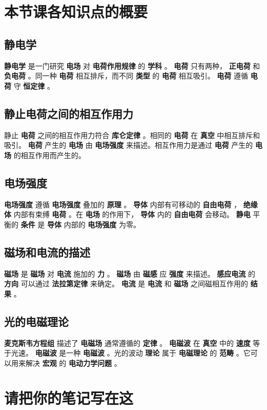 \documentclass{article}%
\begin{document}
%
\section{本节课各知识点的概要}%
\label{sec:}%
\textit{%
}

%
\begin{minipage}{0.95\textwidth}%
\subsection{静电学}%
\label{subsec:}%
%
\textbf{静电学}%
是一门研究%
\textbf{电场}%
对%
\textbf{电荷作用规律}%
的%
\textbf{学科}%
。%
\textbf{电荷}%
只有两种，%
\textbf{正电荷}%
和%
\textbf{负电荷}%
。同一种%
\textbf{电荷}%
相互排斥，而不同%
\textbf{类型}%
的%
\textbf{电荷}%
相互吸引。%
\textbf{电荷}%
遵循%
\textbf{电荷}%
守%
\textbf{恒定律}%
。

%
\subsection{静止电荷之间的相互作用力}%
\label{subsec:}%
静止%
\textbf{电荷}%
之间的相互作用力符合%
\textbf{库仑定律}%
。相同的%
\textbf{电荷}%
在%
\textbf{真空}%
中相互排斥和吸引。%
\textbf{电荷}%
产生的%
\textbf{电场}%
由%
\textbf{电场强度}%
来描述。相互作用力是通过%
\textbf{电荷}%
产生的%
\textbf{电场}%
的相互作用而产生的。

%
\subsection{电场强度}%
\label{subsec:}%
%
\textbf{电场强度}%
遵循%
\textbf{电场强度}%
叠加的%
\textbf{原理}%
。%
\textbf{导体}%
内部有可移动的%
\textbf{自由电荷}%
，%
\textbf{绝缘体}%
内部有束缚%
\textbf{电荷}%
。在%
\textbf{电场}%
的作用下，%
\textbf{导体}%
内的%
\textbf{自由电荷}%
会移动。%
\textbf{静电}%
平衡的%
\textbf{条件}%
是%
\textbf{导体}%
内部的%
\textbf{电场强度}%
为零。

%
\subsection{磁场和电流的描述}%
\label{subsec:}%
%
\textbf{磁场}%
是%
\textbf{磁场}%
对%
\textbf{电流}%
施加的%
\textbf{力}%
。%
\textbf{磁场}%
由%
\textbf{磁感}%
应%
\textbf{强度}%
来描述。%
\textbf{感应电流}%
的%
\textbf{方向}%
可以通过%
\textbf{法拉第定律}%
来确定。%
\textbf{电流}%
是%
\textbf{电流}%
和%
\textbf{磁场}%
之间磁相互作用的%
\textbf{结果}%
。

%
\subsection{光的电磁理论}%
\label{subsec:}%
%
\textbf{麦克斯韦方程组}%
描述了%
\textbf{电磁场}%
通常遵循的%
\textbf{定律}%
。%
\textbf{电磁波}%
在%
\textbf{真空}%
中的%
\textbf{速度}%
等于光速。%
\textbf{电磁波}%
是一种%
\textbf{电磁波}%
。光的波动%
\textbf{理论}%
属于%
\textbf{电磁理论}%
的%
\textbf{范畴}%
。它可以用来解决%
\textbf{宏观}%
的%
\textbf{电动力学问题}%
。

%
\end{minipage}%
\section{请把你的笔记写在这}%
\label{sec:}%

%
\end{document}
